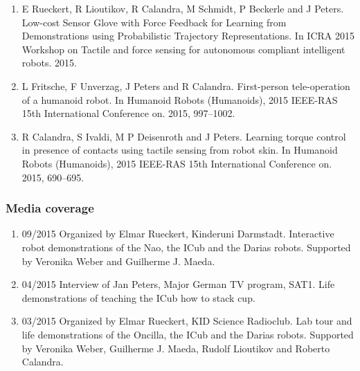 \begin{enumerate}
\item E Rueckert, R Lioutikov, R Calandra, M Schmidt, P Beckerle and J Peters. Low-cost Sensor Glove with Force Feedback for Learning from Demonstrations using Probabilistic Trajectory Representations. In ICRA 2015 Workshop on Tactile and force sensing for autonomous compliant intelligent robots. 2015.
\item L Fritsche, F Unverzag, J Peters and R Calandra. First-person tele-operation of a humanoid robot. In Humanoid Robots (Humanoids), 2015 IEEE-RAS 15th International Conference on. 2015, 997–1002.
\item R Calandra, S Ivaldi, M P Deisenroth and J Peters. Learning torque control in presence of contacts using tactile sensing from robot skin. In Humanoid Robots (Humanoids), 2015 IEEE-RAS 15th International Conference on. 2015, 690–695.
\end{enumerate}
	
\subsubsection{Media coverage}

\begin{enumerate}
\item 09/2015 Organized by Elmar Rueckert, Kinderuni Darmstadt. Interactive robot demonstrations of the Nao, the ICub and the Darias robots. Supported by Veronika Weber and Guilherme J. Maeda.
\item 04/2015 Interview of Jan Peters, Major German TV program, SAT1. Life demonstrations of teaching the ICub how to stack cup.
\item 03/2015 Organized by Elmar Rueckert, KID Science Radioclub. Lab tour and life demonstrations of the Oncilla, the ICub and the Darias robots. Supported by Veronika Weber, Guilherme J. Maeda, Rudolf Lioutikov and Roberto Calandra.

\end{enumerate}

